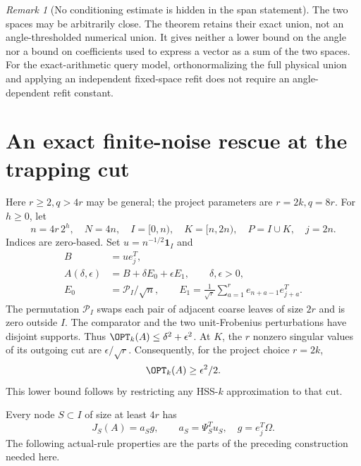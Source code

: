 \documentclass[11pt,oneside,openany,a4paper]{book}
\numberwithin{equation}{chapter}
\theoremstyle{definition}
\theoremstyle{remark}
\newtheorem{remark}[theorem]{Remark}
\begin{document}
\begin{remark}[No conditioning estimate is hidden in the span statement]
The two spaces may be arbitrarily close. The theorem retains their exact union, not an angle-thresholded numerical union. It gives neither a lower bound on the angle nor a bound on coefficients used to express a vector as a sum of the two spaces. For the exact-arithmetic query model, orthonormalizing the full physical union and applying an independent fixed-space refit does not require an angle-dependent refit constant.
\end{remark}

\section{An exact finite-noise rescue at the trapping cut}\label{tangent:sec:family}
Here $r\ge2,q>4r$ may be general; the project parameters are $r=2k,q=8r$. For $h\ge0$, let
\[
 n=4r\,2^h,\quad N=4n,\quad I=[0,n),\quad K=[n,2n),\quad P=I\cup K,\quad j=2n.
\]
Indices are zero-based. Set $u=n^{-1/2}\mathbf1_I$ and
\begin{equation}\label{tangent:eq:family}
 \begin{split}
 B&=ue_j^T,\\
 A(\delta,\epsilon)&=B+\delta E_0+\epsilon E_1,\qquad \delta,\epsilon>0,\\
 E_0&=\mathcal P_I/\sqrt n,\qquad
 E_1=\frac1{\sqrt r}\sum_{a=1}^r e_{n+a-1}e_{j+a}^T.
 \end{split}
\end{equation}
The permutation $\mathcal P_I$ swaps each pair of adjacent coarse leaves of size $2r$ and is zero outside $I$. The comparator and the two unit-Frobenius perturbations have disjoint supports. Thus $\OPT_k(A)\le\delta^2+\epsilon^2$. At $K$, the $r$ nonzero singular values of its outgoing cut are $\epsilon/\sqrt r$. Consequently, for the project choice $r=2k$,
\begin{equation}\label{tangent:eq:optlower}
 \OPT_k(A)\ge\epsilon^2/2.
\end{equation}
This lower bound follows by restricting any HSS-$k$ approximation to that cut.

Every node $S\subset I$ of size at least $4r$ has
\[
 J_S(A)=a_Sg,\qquad a_S=\Psi_S^Tu_S,\quad g=e_j^T\Omega.
\]
The following actual-rule properties are the parts of the preceding construction needed here.
\end{document}
